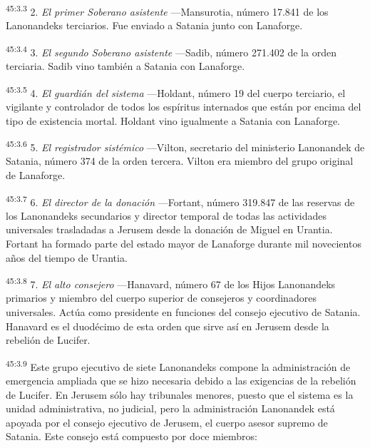 \par
\textsuperscript{45:3.3} 2. \textit{El primer Soberano asistente} ---Mansurotia, número 17.841 de los Lanonandeks terciarios. Fue enviado a Satania junto con Lanaforge.

\par
\textsuperscript{45:3.4} 3. \textit{El segundo Soberano asistente} ---Sadib, número 271.402 de la orden terciaria. Sadib vino también a Satania con Lanaforge.

\par
\textsuperscript{45:3.5} 4. \textit{El guardián del sistema} ---Holdant, número 19 del cuerpo terciario, el vigilante y controlador de todos los espíritus internados que están por encima del tipo de existencia mortal. Holdant vino igualmente a Satania con Lanaforge.

\par
\textsuperscript{45:3.6} 5. \textit{El registrador sistémico} ---Vilton, secretario del ministerio Lanonandek de Satania, número 374 de la orden tercera. Vilton era miembro del grupo original de Lanaforge.

\par
\textsuperscript{45:3.7} 6. \textit{El director de la donación} ---Fortant, número 319.847 de las reservas de los Lanonandeks secundarios y director temporal de todas las actividades universales trasladadas a Jerusem desde la donación de Miguel en Urantia. Fortant ha formado parte del estado mayor de Lanaforge durante mil novecientos años del tiempo de Urantia.

\par
\textsuperscript{45:3.8} 7. \textit{El alto consejero} ---Hanavard, número 67 de los Hijos Lanonandeks primarios y miembro del cuerpo superior de consejeros y coordinadores universales. Actúa como presidente en funciones del consejo ejecutivo de Satania. Hanavard es el duodécimo de esta orden que sirve así en Jerusem desde la rebelión de Lucifer.

\par
\textsuperscript{45:3.9} Este grupo ejecutivo de siete Lanonandeks compone la administración de emergencia ampliada que se hizo necesaria debido a las exigencias de la rebelión de Lucifer. En Jerusem sólo hay tribunales menores, puesto que el sistema es la unidad administrativa, no judicial, pero la administración Lanonandek está apoyada por el consejo ejecutivo de Jerusem, el cuerpo asesor supremo de Satania. Este consejo está compuesto por doce miembros:


